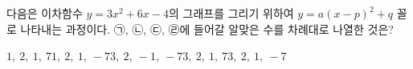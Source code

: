 다음은 이차함수 $y=3x^2+6x-4$의 그래프를 그리기 위하여 $y=a(x-p)^2+q$ 꼴로 나타내는 과정이다. ㉠, ㉡, ㉢, ㉣에 들어갈 알맞은 수를 차례대로 나열한 것은? 
\begin{choices32}{$1,\ 2,\ 1,\ 7$}{$1,\ 2,\ 1,\ -7$}{$3,\ 2,\ -1,\ -7$}{$3,\ 2,\ 1,\ 7$}{$3,\ 2,\ 1,\ -7$}\end{choices32}
